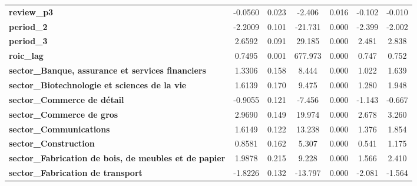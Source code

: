 \begin{center}
\begin{tabular}{lcccccc}
\textbf{review\_p3}                                                   &      -0.0560  &        0.023     &    -2.406  &         0.016        &       -0.102    &       -0.010     \\
\textbf{period\_2}                                                    &      -2.2009  &        0.101     &   -21.731  &         0.000        &       -2.399    &       -2.002     \\
\textbf{period\_3}                                                    &       2.6592  &        0.091     &    29.185  &         0.000        &        2.481    &        2.838     \\
\textbf{roic\_lag}                                                    &       0.7495  &        0.001     &   677.973  &         0.000        &        0.747    &        0.752     \\
\textbf{sector\_Banque, assurance et services financiers}             &       1.3306  &        0.158     &     8.444  &         0.000        &        1.022    &        1.639     \\
\textbf{sector\_Biotechnologie et sciences de la vie}                 &       1.6139  &        0.170     &     9.475  &         0.000        &        1.280    &        1.948     \\
\textbf{sector\_Commerce de détail}                                   &      -0.9055  &        0.121     &    -7.456  &         0.000        &       -1.143    &       -0.667     \\
\textbf{sector\_Commerce de gros}                                     &       2.9690  &        0.149     &    19.974  &         0.000        &        2.678    &        3.260     \\
\textbf{sector\_Communications}                                       &       1.6149  &        0.122     &    13.238  &         0.000        &        1.376    &        1.854     \\
\textbf{sector\_Construction}                                         &       0.8581  &        0.162     &     5.307  &         0.000        &        0.541    &        1.175     \\
\textbf{sector\_Fabrication de bois, de meubles et de papier}         &       1.9878  &        0.215     &     9.228  &         0.000        &        1.566    &        2.410     \\
\textbf{sector\_Fabrication de transport}                             &      -1.8226  &        0.132     &   -13.797  &         0.000        &       -2.081    &       -1.564     \\

\end{tabular}
\end{center}
